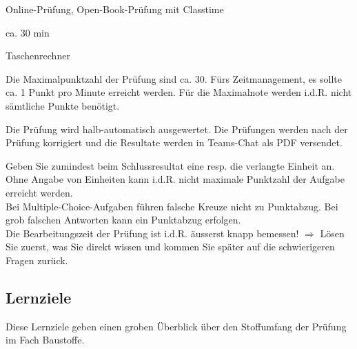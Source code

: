 \begin{description}[leftmargin=!,labelwidth=\widthof{Hinweise zur Bearbeitung...},font=\normalfont]
    \item [Prüfungsmodus] Online-Prüfung, Open-Book-Prüfung mit Classtime
    \item  [Prüfungsdauer] ca. 30 min
    \item [Empfohlene Hilfsmittel] Taschenrechner
    \item [Anzahl Punkte] Die Maximalpunktzahl der Prüfung sind ca. 30.  Fürs Zeitmanagement, es sollte ca. 1 Punkt pro Minute erreicht werden. Für die Maximalnote werden i.d.R. nicht sämtliche Punkte benötigt.
    \item [Bewertung] Die Prüfung wird halb-automatisch ausgewertet. Die Prüfungen werden nach der Prüfung korrigiert und die Resultate werden in Teams-Chat als PDF versendet.
    \item [Hinweise zur Bearbeitung] Geben Sie zumindest beim Schlussresultat eine resp. die verlangte Einheit an. Ohne Angabe von Einheiten kann i.d.R. nicht maximale Punktzahl der Aufgabe erreicht werden. \\ Bei Multiple-Choice-Aufgaben führen falsche Kreuze nicht zu Punktabzug. Bei grob falschen Antworten kann ein Punktabzug erfolgen. \\ Die Bearbeitungszeit der Prüfung ist i.d.R. äusserst knapp bemessen! $\Rightarrow$ Lösen Sie zuerst, was Sie direkt wissen und kommen Sie später auf die schwierigeren Fragen zurück.
\end{description}


\pagebreak
\subsection*{Lernziele}
Diese Lernziele geben einen groben Überblick über den Stoffumfang der \nrPruefung\xspace Prüfung im Fach Baustoffe.



%
%
%
%









